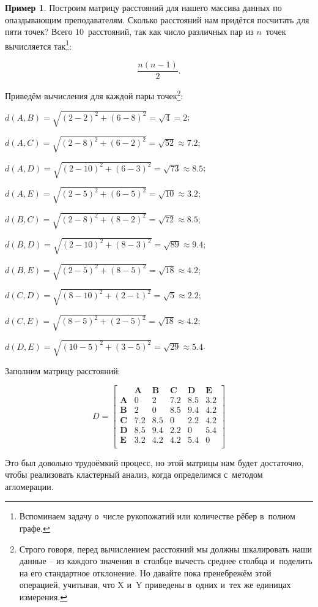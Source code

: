 \documentclass[12pt,a4paper]{article}
\theoremstyle{definition}
\newtheorem{example}{Пример}
\begin{document}
\begin{example}
Построим матрицу расстояний для нашего массива данных по опаздывающим преподавателям. 
Сколько расстояний нам придётся посчитать для пяти точек? Всего $10$~расстояний, так как 
число различных пар из $n$~точек вычисляется так\footnote{Вспоминаем задачу 
о~числе рукопожатий или количестве рёбер в~полном графе.}:

$$
\frac{n(n-1)}{2}.
$$

Приведём вычисления для каждой пары точек\footnote{Строго говоря, перед 
вычислением расстояний мы должны шкалировать наши данные – из каждого 
значения в~столбце вычесть среднее столбца и~поделить на его стандартное 
отклонение. Но давайте пока пренебрежём этой операцией, учитывая, что 
$\text{X}$ и~$\text{Y}$ приведены в~одних и~тех же единицах измерения.}:

$d(A, B) = \sqrt{(2-2)^2 + (6-8)^2} = \sqrt{4} = 2$;

$d(A, C) = \sqrt{(2-8)^2 + (6-2)^2} =  \sqrt{52} \approx 7.2$;

$d(A, D) = \sqrt{(2-10)^2 + (6-3)^2} = \sqrt{73} \approx 8.5$; 

$d(A, E) = \sqrt{(2-5)^2 + (6-5)^2} = \sqrt{10} \approx 3.2$;

$d(B, C) = \sqrt{(2-8)^2 + (8-2)^2} = \sqrt{72} \approx 8.5$; 

$d(B, D) = \sqrt{(2-10)^2 + (8-3)^2} = \sqrt{89} \approx 9.4$; 

$d(B, E) = \sqrt{(2-5)^2 + (8-5)^2} = \sqrt{18} \approx 4.2$; 

$d(C, D) = \sqrt{(8-10)^2 + (2-1)^2} = \sqrt{5} \approx 2.2$; 

 $d(C, E) = \sqrt{(8-5)^2 + (2-5)^2} = \sqrt{18} \approx 4.2$; 
 
 $d(D, E) = \sqrt{(10-5)^2 + (3-5)^2} = \sqrt{29} \approx 5.4$. 

Заполним матрицу расстояний:

$$
D = \begin{bmatrix}
& \bm{A} & \bm{B} & \bm{C} & \bm{D} & \bm{E} \\
\bm{A} & 0 & 2 & 7.2 & 8.5 & 3.2 \\
\bm{B} & 2 & 0 & 8.5 & 9.4 & 4.2 \\
\bm{C} & 7.2 & 8.5 & 0 &  2.2 & 4.2 \\
\bm{D} & 8.5 & 9.4 & 2.2 & 0 & 5.4\\
\bm{E} & 3.2 & 4.2 & 4.2 & 5.4  & 0\\
\end{bmatrix}
$$

Это был довольно трудоёмкий процесс, но этой матрицы нам будет достаточно, чтобы 
реализовать кластерный анализ, когда определимся с~методом агломерации.
\end{example}
\end{document}

